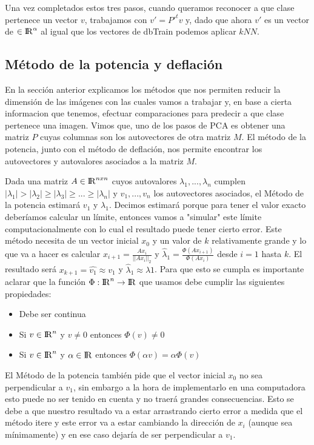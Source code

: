 Una vez completados estos tres pasos, cuando queramos reconocer a que clase pertenece un vector $v$, trabajamos con $v'= P'^tv$ y, dado que ahora $v'$ es un vector de $\in {\rm I\!R}^{\alpha}$ al igual que los vectores de dbTrain podemos aplicar $kNN$.

\subsection{Método de la potencia y deflación}
En la sección anterior explicamos los métodos que nos permiten reducir la dimensión de las imágenes con las cuales vamos a trabajar y, en base a cierta informacion que tenemos, efectuar comparaciones para predecir a que clase pertenece una imagen. Vimos que, uno de los pasos de PCA es obtener una matriz $P$ cuyas columnas son los autovectores de otra matriz $M$. El método de la potencia, junto con el método de deflación, nos permite encontrar los autovectores y autovalores asociados a la matriz $M$.
\par Dada una matriz $A \in {\rm I\!R}^{nxn}$ cuyos autovalores $\lambda_1, ..., \lambda_n$ cumplen $|\lambda_1| > |\lambda_2| \geq |\lambda_3| \geq ... \geq |\lambda_n|$ y $v_1, ..., v_n$ los autovectores asociados, el Método de la potencia estimará $v_1$ y $\lambda_1$. Decimos estimará porque para tener el valor exacto deberíamos calcular un límite, entonces vamos a "simular" este límite computacionalmente con lo cual el resultado puede tener cierto error. Este método necesita de un vector inicial $x_0$ y un valor de $k$ relativamente grande y lo que va a hacer es calcular $x_{i + 1} = \frac{Ax_i}{||Ax_i||_2}$ y $\widehat{\lambda}_1 = \frac{\Phi(Ax_{i + 1})}{\Phi(Ax_i)}$ desde $i = 1$ hasta $k$. El resultado será $x_{k + 1} = \widehat{v_1} \approx v_1$ y $\widehat{\lambda}_1 \approx \lambda1$. Para que esto se cumpla es importante aclarar que la función $\Phi: {\rm I\!R}^{n}\rightarrow {\rm I\!R}$ que usamos debe cumplir las siguientes propiedades:
\begin{itemize}
\item Debe ser continua
\item Si $v \in {\rm I\!R}^{n}$ y $v \neq 0$ entonces $\Phi(v) \neq 0$
\item Si $v \in {\rm I\!R}^{n}$ y $\alpha \in {\rm I\!R}$ entonces $\Phi(\alpha v) = \alpha\Phi(v)$
\end{itemize}
El Método de la potencia también pide que el vector inicial $x_0$ no sea perpendicular a $v_1$, sin embargo a la hora de implementarlo en una computadora esto puede no ser tenido en cuenta y no traerá grandes consecuencias. Esto se debe a que nuestro resultado va a estar arrastrando cierto error a medida que el método itere y este error va a estar cambiando la dirección de $x_i$ (aunque sea mínimamente) y en ese caso dejaría de ser perpendicular a $v_1$.

